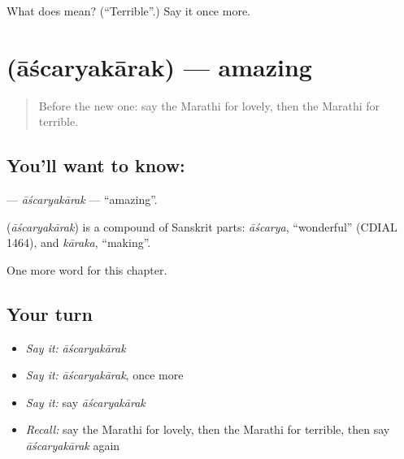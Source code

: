 \begin{tcolorbox}[breakable,colback=teal!4,colframe=teal!35!black,title={Before you move on}]
What does  mean? (\textquotedblleft{}Terrible\textquotedblright{}.) Say it once more.
\end{tcolorbox}
\section[\texorpdfstring{\mr{आश्चर्यकारक} (āścaryakārak)}{आश्चर्यकारक (āścaryakārak)}]{ (āścaryakārak) — amazing}

\label{lesson:MR-C235-ascaryakarak}



\begin{quote}
Before the new one: say the Marathi for lovely, then the Marathi for terrible.
\end{quote}

\subsection*{You'll want to know: }
\textbf{} — \emph{āścaryakārak} — \textquotedblleft{}amazing\textquotedblright{}.

\begin{cousinweb}
\textbf{} (\emph{āścaryakārak}) is a compound of Sanskrit parts: \emph{āścarya}, \textquotedblleft{}wonderful\textquotedblright{} (CDIAL 1464), and \emph{kāraka}, \textquotedblleft{}making\textquotedblright{}.
\end{cousinweb}

\begin{grammarlens}[title={What you've built}]
One more word for this chapter.
\end{grammarlens}

\subsection*{Your turn}
\begin{itemize}
\raggedright
  \item \emph{Say it:} \emph{āścaryakārak}
  \item \emph{Say it:} \emph{āścaryakārak}, once more
  \item \emph{Say it:} say \emph{āścaryakārak}
  \item \emph{Recall:} say the Marathi for lovely, then the Marathi for terrible, then say \emph{āścaryakārak} again
\end{itemize}

